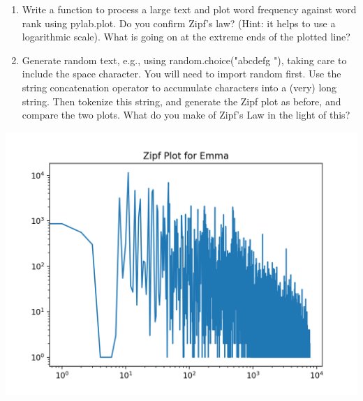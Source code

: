 \documentclass[12pt]{article}
\begin{document}
\begin{enumerate}
	\item Write a function to process a large text and plot word frequency against word rank using pylab.plot. Do you confirm Zipf's law? (Hint: it helps to use a logarithmic scale). What is going on at the extreme ends of the plotted line?
	
	\item Generate random text, e.g., using random.choice("abcdefg "), taking care to include the space character. You will need to import random first. Use the string concatenation operator to accumulate characters into a (very) long string. Then tokenize this string, and generate the Zipf plot as before, and compare the two plots. What do you make of Zipf's Law in the light of this?
\end{enumerate}

\includegraphics[scale=0.7]{ZipfEmma.png}\\
\end{document}
